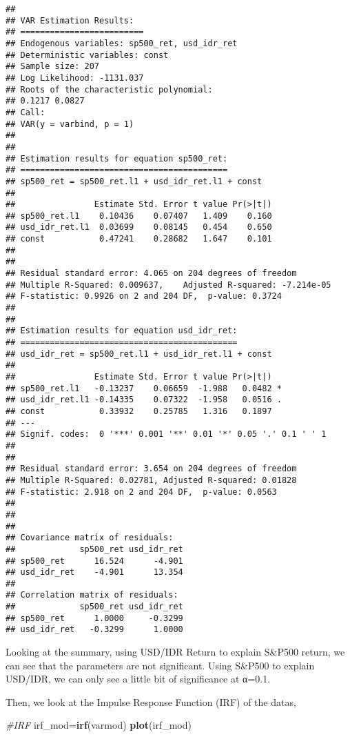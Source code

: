 \documentclass[]{article}
\newenvironment{Shaded}{\begin{snugshade}}{\end{snugshade}}
\newcommand{\KeywordTok}[1]{\textcolor[rgb]{0.13,0.29,0.53}{\textbf{#1}}}
\newcommand{\CommentTok}[1]{\textcolor[rgb]{0.56,0.35,0.01}{\textit{#1}}}
\newcommand{\NormalTok}[1]{#1}
\begin{document}
\begin{verbatim}
## 
## VAR Estimation Results:
## ========================= 
## Endogenous variables: sp500_ret, usd_idr_ret 
## Deterministic variables: const 
## Sample size: 207 
## Log Likelihood: -1131.037 
## Roots of the characteristic polynomial:
## 0.1217 0.0827
## Call:
## VAR(y = varbind, p = 1)
## 
## 
## Estimation results for equation sp500_ret: 
## ========================================== 
## sp500_ret = sp500_ret.l1 + usd_idr_ret.l1 + const 
## 
##                Estimate Std. Error t value Pr(>|t|)
## sp500_ret.l1    0.10436    0.07407   1.409    0.160
## usd_idr_ret.l1  0.03699    0.08145   0.454    0.650
## const           0.47241    0.28682   1.647    0.101
## 
## 
## Residual standard error: 4.065 on 204 degrees of freedom
## Multiple R-Squared: 0.009637,    Adjusted R-squared: -7.214e-05 
## F-statistic: 0.9926 on 2 and 204 DF,  p-value: 0.3724 
## 
## 
## Estimation results for equation usd_idr_ret: 
## ============================================ 
## usd_idr_ret = sp500_ret.l1 + usd_idr_ret.l1 + const 
## 
##                Estimate Std. Error t value Pr(>|t|)  
## sp500_ret.l1   -0.13237    0.06659  -1.988   0.0482 *
## usd_idr_ret.l1 -0.14335    0.07322  -1.958   0.0516 .
## const           0.33932    0.25785   1.316   0.1897  
## ---
## Signif. codes:  0 '***' 0.001 '**' 0.01 '*' 0.05 '.' 0.1 ' ' 1
## 
## 
## Residual standard error: 3.654 on 204 degrees of freedom
## Multiple R-Squared: 0.02781, Adjusted R-squared: 0.01828 
## F-statistic: 2.918 on 2 and 204 DF,  p-value: 0.0563 
## 
## 
## 
## Covariance matrix of residuals:
##             sp500_ret usd_idr_ret
## sp500_ret      16.524      -4.901
## usd_idr_ret    -4.901      13.354
## 
## Correlation matrix of residuals:
##             sp500_ret usd_idr_ret
## sp500_ret      1.0000     -0.3299
## usd_idr_ret   -0.3299      1.0000
\end{verbatim}

Looking at the summary, using USD/IDR Return to explain S\&P500 return,
we can see that the parameters are not significant. Using S\&P500 to
explain USD/IDR, we can only see a little bit of significance at α=0.1.

Then, we look at the Impulse Response Function (IRF) of the datas,

\begin{Shaded}
\begin{Highlighting}[]
\CommentTok{#IRF}
\NormalTok{irf_mod=}\KeywordTok{irf}\NormalTok{(varmod)}
\KeywordTok{plot}\NormalTok{(irf_mod)}
\end{Highlighting}
\end{Shaded}
\end{document}
